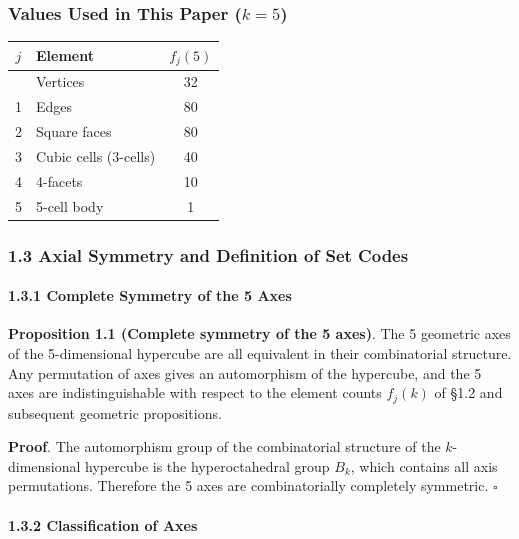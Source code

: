 \documentclass[
  a4paper,11pt]{article}
\newcounter{none}
\theoremstyle{definition}
\theoremstyle{remark}
\begin{document}
\subsubsection{\texorpdfstring{Values Used in This Paper
(\(k=5\))}{Values Used in This Paper (k=5)}}\label{values-used-in-this-paper-k5}

{\def\LTcaptype{none} %
\begin{longtable}[]{@{}clc@{}}
\toprule\noalign{}
\(j\) & Element & \(f_j(5)\) \\
\midrule\noalign{}
\endhead
\bottomrule\noalign{}
\endlastfoot
0 & Vertices & 32 \\
1 & Edges & 80 \\
2 & Square faces & 80 \\
3 & Cubic cells (3-cells) & 40 \\
4 & 4-facets & 10 \\
5 & 5-cell body & 1 \\
\end{longtable}
}

\subsubsection{1.3 Axial Symmetry and Definition of Set
Codes}\label{axial-symmetry-and-definition-of-set-codes}

\paragraph{1.3.1 Complete Symmetry of the 5
Axes}\label{complete-symmetry-of-the-5-axes}

\textbf{Proposition 1.1 (Complete symmetry of the 5 axes)}. The 5
geometric axes of the 5-dimensional hypercube are all equivalent in
their combinatorial structure. Any permutation of axes gives an
automorphism of the hypercube, and the 5 axes are indistinguishable with
respect to the element counts \(f_j(k)\) of §1.2 and subsequent
geometric propositions.

\textbf{Proof}. The automorphism group of the combinatorial structure of
the \(k\)-dimensional hypercube is the hyperoctahedral group \(B_k\),
which contains all axis permutations. Therefore the 5 axes are
combinatorially completely symmetric. \(\square\)

\paragraph{1.3.2 Classification of Axes}\label{classification-of-axes}
\end{document}
